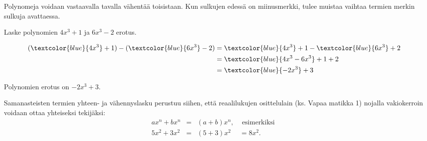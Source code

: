 Polynomeja voidaan vastaavalla tavalla vähentää toisistaan. Kun sulkujen edessä on
miinusmerkki, tulee muistaa vaihtaa termien merkin sulkuja avattaessa.

\begin{esimerkki}
    Laske polynomien $4x^3+1$ ja $6x^3-2$ erotus.
    \begin{esimratk}
        \begin{align*}
		(\textcolor{blue}{4x^3}+1)-(\textcolor{blue}{6x^3}-2) 
		&= \textcolor{blue}{4x^3}+1 - \textcolor{blue}{6x^3} + 2 \\
		&= \textcolor{blue}{4x^3-6x^3} +1 +2 \\
		&=\textcolor{blue}{-2x^3}+3
        \end{align*}
    \end{esimratk}
    \begin{esimvast}
        Polynomien erotus on $-2x^3+3$.
    \end{esimvast}
\end{esimerkki}


Samanasteisten termien yhteen- ja vähennyslasku perustuu siihen,
että reaalilukujen osittelulain (ks. Vapaa matikka 1) nojalla vakiokerroin voidaan ottaa yhteiseksi tekijäksi:
\[ \begin{array}{rcll}
ax^n+bx^n &=&(a+b)x^n, & \text{ esimerkiksi }\\
5x^2+3x^2 &=& (5+3)x^2 &= 8x^2.
\end{array} 
\]

